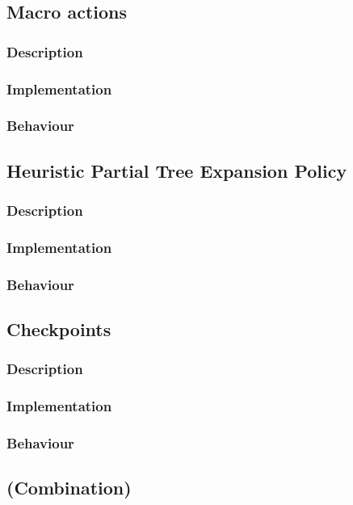 \documentclass[10pt,a4paper]{article}
\begin{document}
\subsection{Macro actions}
\label{macro}
\cite{salesman}
\subsubsection{Description}
\subsubsection{Implementation}
\subsubsection{Behaviour}
\subsection{Heuristic Partial Tree Expansion Policy}
\subsubsection{Description}
\subsubsection{Implementation}
\subsubsection{Behaviour}
\subsection{Checkpoints}
\subsubsection{Description}
\subsubsection{Implementation}
\subsubsection{Behaviour}
\subsection{(Combination)}
\end{document}
